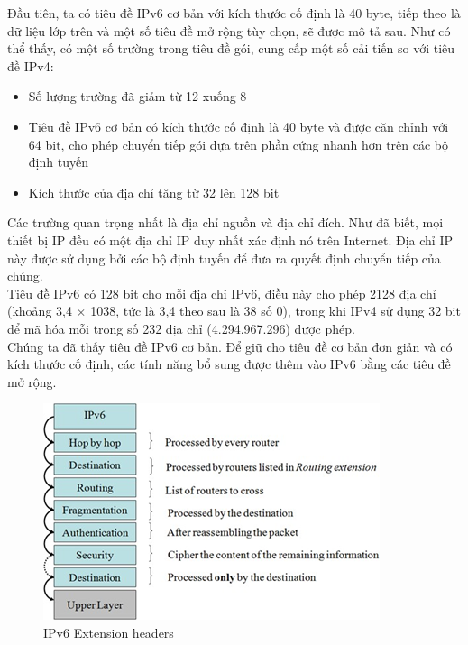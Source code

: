 \documentclass{report}
\begin{document}
Đầu tiên, ta có tiêu đề IPv6 cơ bản với kích thước cố định là 40 byte, tiếp theo là dữ liệu lớp trên và một số tiêu đề mở rộng tùy chọn, sẽ được mô tả sau. Như có thể thấy, có một số trường trong tiêu đề gói, cung cấp một số cải tiến so với tiêu đề IPv4: 
\begin{itemize}
	\item Số lượng trường đã giảm từ 12 xuống 8
	\item Tiêu đề IPv6 cơ bản có kích thước cố định là 40 byte và được căn chỉnh với 64 bit, cho phép chuyển tiếp gói dựa trên phần cứng nhanh hơn trên các bộ định tuyến
	\item Kích thước của địa chỉ tăng từ 32 lên 128 bit
\end{itemize}
Các trường quan trọng nhất là địa chỉ nguồn và địa chỉ đích. Như đã biết, mọi thiết bị IP đều có một địa chỉ IP duy nhất xác định nó trên Internet. Địa chỉ IP này được sử dụng bởi các bộ định tuyến để đưa ra quyết định chuyển tiếp của chúng. \\

Tiêu đề IPv6 có 128 bit cho mỗi địa chỉ IPv6, điều này cho phép 2128 địa chỉ (khoảng 3,4 × 1038, tức là 3,4 theo sau là 38 số 0), trong khi IPv4 sử dụng 32 bit để mã hóa mỗi trong số 232 địa chỉ (4.294.967.296) được phép. \\

Chúng ta đã thấy tiêu đề IPv6 cơ bản. Để giữ cho tiêu đề cơ bản đơn giản và có kích thước cố định, các tính năng bổ sung được thêm vào IPv6 bằng các tiêu đề mở rộng. \\

\begin{figure}[h]
	\centering
	\includegraphics[scale = 0.7]{fig22.png}
	\caption{IPv6 Extension headers}
	\label{fig:Graph22}
\end{figure}
\end{document}
